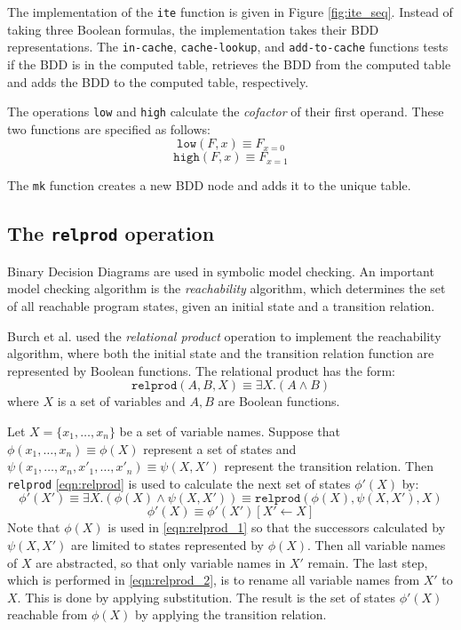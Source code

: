 The implementation of the \texttt{ite} function is given in Figure \ref{fig:ite_seq}. Instead of taking three Boolean formulas, the implementation takes their BDD representations. The \texttt{in-cache}, \texttt{cache-lookup}, and \texttt{add-to-cache} functions tests if the BDD is in the computed table, retrieves the BDD from the computed table and adds the BDD to the computed table, respectively.

The operations \texttt{low} and \texttt{high} calculate the \emph{cofactor} of their first operand. These two functions are specified as follows:
\begin{equation}
	\texttt{low}(F, x) \equiv F_{x=0}
\end{equation}
\begin{equation}
	\texttt{high}(F, x) \equiv F_{x=1}
\end{equation}

The \texttt{mk} function creates a new BDD node and adds it to the unique table.

\subsection{The \texttt{relprod} operation}
Binary Decision Diagrams are used in symbolic model checking. An important model checking algorithm is the \emph{reachability} algorithm, which determines the set of all reachable program states, given an initial state and a transition relation. 

Burch et al. \cite{burch1994symbolic} used the \emph{relational product} operation to implement the reachability algorithm, where both the initial state and the transition relation function are represented by Boolean functions. The relational product has the form: 
\begin{equation}
	\texttt{relprod}(A, B, X) \equiv \exists X. (A \wedge B)
	\label{eqn:relprod}
\end{equation}
where $X$ is a set of variables and $A, B$ are Boolean functions.

Let $X = \{ x_1, \dots, x_n \}$ be a set of variable names. Suppose that $\phi(x_1, \dots, x_n) \equiv \phi(X)$ represent a set of states and $\psi(x_1, \dots, x_n, x'_1, \dots, x'_n) \equiv \psi(X, X')$ represent the transition relation. Then \texttt{relprod} \ref{eqn:relprod} is used to calculate the next set of states $\phi'(X)$ by:
\begin{equation}
	\phi'(X') \equiv \exists X. (\phi(X) \wedge \psi(X, X')) \equiv \texttt{relprod}(\phi(X), \psi(X, X'), X)
	\label{eqn:relprod_1}
\end{equation}
\begin{equation}
	\phi'(X) \equiv \phi'(X')[X' \gets X]
	\label{eqn:relprod_2}
\end{equation}
Note that $\phi(X)$ is used in \ref{eqn:relprod_1} so that the successors calculated by $\psi(X, X')$ are limited to states represented by $\phi(X)$. Then all variable names of $X$ are abstracted, so that only variable names in $X'$ remain. The last step, which is performed in \ref{eqn:relprod_2}, is to rename all variable names from $X'$ to $X$. This is done by applying substitution. The result is the set of states $\phi'(X)$ reachable from $\phi(X)$ by applying the transition relation.

